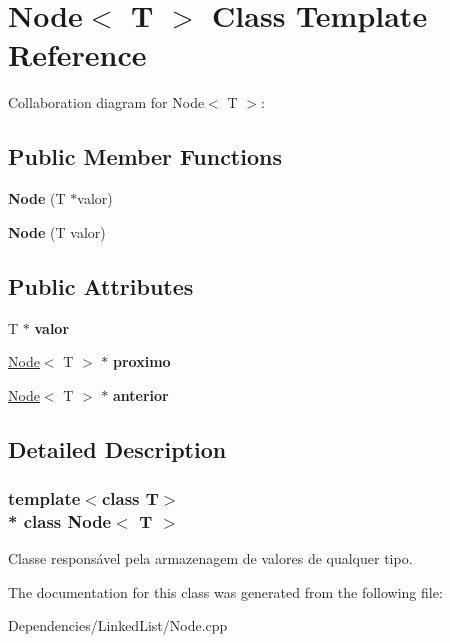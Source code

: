 \hypertarget{class_node}{}\section{Node$<$ T $>$ Class Template Reference}
\label{class_node}


Collaboration diagram for Node$<$ T $>$\+:
\subsection*{Public Member Functions}
\begin{DoxyCompactItemize}
\item 
{\bfseries Node} (T $\ast$valor)\hypertarget{class_node_add46056cb7e00b237b26a61a5166cf9d}{}\label{class_node_add46056cb7e00b237b26a61a5166cf9d}

\item 
{\bfseries Node} (T valor)\hypertarget{class_node_a25d6a5ffc8af76558c7af41c062fca54}{}\label{class_node_a25d6a5ffc8af76558c7af41c062fca54}

\end{DoxyCompactItemize}
\subsection*{Public Attributes}
\begin{DoxyCompactItemize}
\item 
T $\ast$ {\bfseries valor}\hypertarget{class_node_a54ec82bf4c4cb24e14c553ab0981bca2}{}\label{class_node_a54ec82bf4c4cb24e14c553ab0981bca2}

\item 
\hyperlink{class_node}{Node}$<$ T $>$ $\ast$ {\bfseries proximo}\hypertarget{class_node_a58cc1d61f40d178415ec4b7e7eefb470}{}\label{class_node_a58cc1d61f40d178415ec4b7e7eefb470}

\item 
\hyperlink{class_node}{Node}$<$ T $>$ $\ast$ {\bfseries anterior}\hypertarget{class_node_a7982b4f7a8738ee6dee6718c568fc998}{}\label{class_node_a7982b4f7a8738ee6dee6718c568fc998}

\end{DoxyCompactItemize}


\subsection{Detailed Description}
\subsubsection*{template$<$class T$>$\\*
class Node$<$ T $>$}

Classe responsável pela armazenagem de valores de qualquer tipo. 

The documentation for this class was generated from the following file\+:\begin{DoxyCompactItemize}
\item 
Dependencies/\+Linked\+List/Node.\+cpp\end{DoxyCompactItemize}
